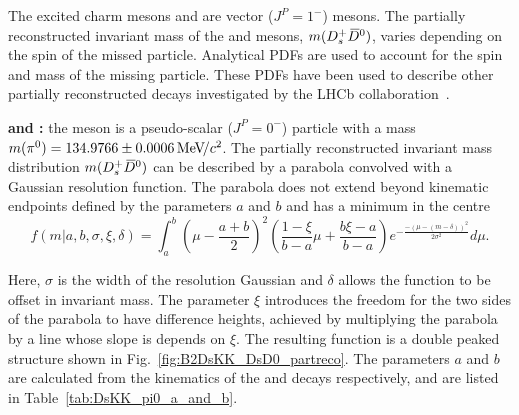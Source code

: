The excited charm mesons \Dstarzb and \Dss are vector ($J^{P} = 1^{-}$) mesons. The partially reconstructed invariant mass of the \Dsp and \Dzb mesons, $m({{D}^+_{s}}{{\kern 0.2em\overline{\kern -0.2em D}{}}{}^0})$, varies depending on the spin of the missed particle.
Analytical PDFs are used to account for the spin and mass of the missing particle. These PDFs have been used to describe other partially reconstructed  decays investigated by the LHCb collaboration~\cite{LHCb-PAPER-2017-021}. 

\begin{description}
\item \textbf{\decay{\Bp}{(\decay{\Dssp}{\Dsp[\piz]})\Dzb} and \decay{\Bp}{\Dsp(\decay{\Dstarzb}{\Dzb[\piz]})}:} the \piz meson is a pseudo-scalar ($J^{P} = 0^{-}$) particle with a mass $m({{\pi}^0}) = 134.9766 \pm 0.0006 {\mathrm{\,Me\kern -0.1em V\!/}c^2}$. The partially reconstructed invariant mass distribution $m({{D}^+_{s}}{{\kern 0.2em\overline{\kern -0.2em D}{}}{}^0})$ can be described by a parabola convolved with a Gaussian resolution function. The parabola does not extend beyond kinematic endpoints defined by the parameters $a$ and $b$ and has a minimum in the centre 
\begin{equation}
f(m|a,b,\sigma,\xi, \delta) = \int_{a}^{b}\left(\mu-\frac{a+b}{2}\right)^{2} \left( \frac{1-\xi}{b-a}\mu + \frac{b\xi-a}{b-a} \right) e^{-\frac{-(\mu-(m-\delta))^{2}}{2\sigma^{2}}} d\mu.
\end{equation} 

Here, $\sigma$ is the width of the resolution Gaussian and $\delta$ allows the function to be offset in invariant mass. The parameter $\xi$ introduces the freedom for the two sides of the parabola to have difference heights, achieved by multiplying the parabola by a line whose slope is depends on $\xi$. The resulting function is a double peaked structure shown in Fig.~\ref{fig:B2DsKK_DsD0_partreco}.   
The parameters $a$ and $b$ are calculated from the kinematics of the \decay{\Bp}{(\decay{\Dssp}{\Dsp\piz})\Dzb} and \decay{\Bp}{\Dsp(\decay{\Dstarzb}{\Dzb\piz})} decays respectively, and are listed in Table~\ref{tab:DsKK_pi0_a_and_b}.

\end{description}

